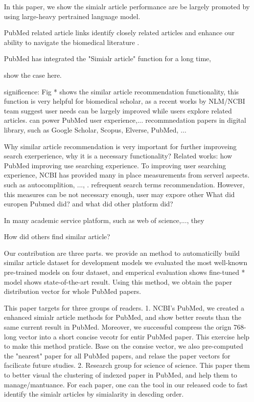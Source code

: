 \documentclass[11pt]{article}
\begin{document}
    In this paper, we show the simialr article performance are be largely promoted by using large-heavy pertrained language model.

    PubMed related article links identify closely related articles and enhance our ability to navigate the biomedical literature \cite{Enriching2009}.

    PubMed has integrated the "Simialr article" function for a long time,

    show the case here.

    significence:
    Fig * shows the similar article recommendation functionality, this function is very helpful for biomedical scholar, as a recent works by NLM/NCBI team suggest user needs can be largely improved while users explore related articles.
    can power PubMed user experience,...
    recommnedation papers in digital library, such as Google Scholar, Scopus, Elverse, PubMed, ...

    Why similar article recommendation is very important for further improveing search exerperience, why it is a necessary functionality?
    Related works: how PubMed improving use searching experience. To improving user searching experience, NCBI has provided many in place measurements from serverl aspects.
    such as autocomplition, ..., . refrequent search terms recommendation. However, this measures can be not necessary enough, user may expore other
    What did europen Pubmed did? and what did other platform did?

    In many academic service platform, such as web of science,..., they

    How did others find similar article?

    Our contribution are three parts.
    we provide an method to automaticilly build similar article dataset for development models
    we evaluated the most well-known pre-trained models on four dataset, and emperical evaluation shows fine-tuned * model shows state-of-the-art result.
    Using this method, we obtain the paper distribution vector for whole PubMed papers.

    This paper targets for three groups of readers. 1. NCBI's PubMed, we created a enhanced simialr article methods for PubMed, and show better resuts than the same current result in PubMed. Moreover, we successful compress the orign 768-long vector into a short concise vecotr for entir PubMed paper.
    This exercise help to make this method praticle. Base on the consise vector, we also pre-computed the "nearest" paper for all PubMed papers, and relase the paper vectors for facilicate future studies.
    2. Research group for science of science. This paper them to better visual the clustering of indexed paper in PubMed, and help them to manage/mantuance. For each paper, one can the tool in our released code to fast identify the simialr articles by simialarity in descding order.
\end{document}
